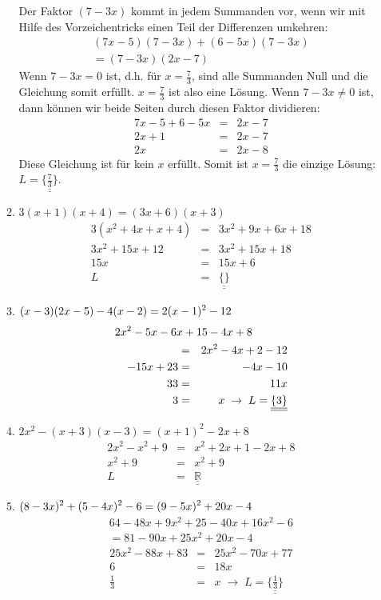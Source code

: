 \documentclass[%
11pt,%
twoside,%
titlepage,%
german,%
]{scrartcl}
\newcommand{\result}[1]{\underline{\underline{#1}}}
\begin{document}
\begin{enumerate}
\begin{enumerate}
    Der Faktor $(7-3x)$ kommt in jedem Summanden vor, wenn wir mit Hilfe des Vorzeichentricks einen Teil der Differenzen umkehren:
    \begin{eqnarray*}
       (7x-5)(7-3x)+(6-5x)(7-3x) \\ =(7-3x)(2x-7)
    \end{eqnarray*}
    Wenn $7-3x=0$ ist, d.h. f\"ur $x=\frac{7}{3}$, sind alle Summanden Null und die Gleichung somit erf\"ullt. $x=\frac{7}{3}$ ist also eine L\"osung. Wenn $7-3x\neq 0$ ist, dann k\"onnen wir beide Seiten durch diesen Faktor dividieren:
    \begin{eqnarray*}
      7x-5 + 6-5x & = & 2x-7 \\
      2x + 1 & = & 2x - 7 \\
      2x & = & 2x - 8
    \end{eqnarray*}
    Diese Gleichung ist f\"ur kein $x$ erf\"ullt. Somit ist $x=\frac{7}{3}$ die einzige L\"osung: $L=\result{\{\frac{7}{3}\}}$.
  \item $\displaystyle 3(x+1)(x+4)=(3x+6)(x+3)$
    \begin{eqnarray*}
      3(x^2+4x+x+4) & = & 3x^2+9x+6x+18 \\
      3x^2+15x+12 & = & 3x^2 +15x+18 \\
      15x & = & 15x + 6 \\
      L & = & \result{\{\}}
    \end{eqnarray*}
  \item $\displaystyle (x-3)(2x-5)-4(x-2) \\ =2(x-1)^2-12$
    \begin{eqnarray*}
      \lefteqn{2x^2-5x-6x+15-4x+8} \hspace{2cm}\\
      & = & 2x^2-4x+2-12 \\
      -15x+23 & = & -4x-10 \\
      33 & = & 11x \\
      3 & = & x \;\to\; L=\result{\{3\}}
    \end{eqnarray*}
  \item $\displaystyle 2x^2-(x+3)(x-3)=(x+1)^2-2x+8$
    \begin{eqnarray*}
      2x^2-x^2+9 & = & x^2+2x+1 - 2x +8 \\
      x^2 + 9 & = & x^2 + 9 \\
      L & = & \result{\mathbb{R}}
    \end{eqnarray*}
  \item $\displaystyle (8-3x)^2+(5-4x)^2-6 \\ =(9-5x)^2+20x-4$
    \begin{eqnarray*}
      64-48x+9x^2 + 25-40x+16x^2 - 6 \\
      = 81-90x+25x^2+20x-4
    \end{eqnarray*}
    \begin{eqnarray*}
      25x^2 - 88x +83 & = & 25x^2 - 70x + 77 \\
      6 & = & 18x \\
      \frac{1}{3} & = & x \;\to\; L=\result{\{\frac{1}{3}\}}
    \end{eqnarray*}
  \end{enumerate}


\end{enumerate}
\end{document}

